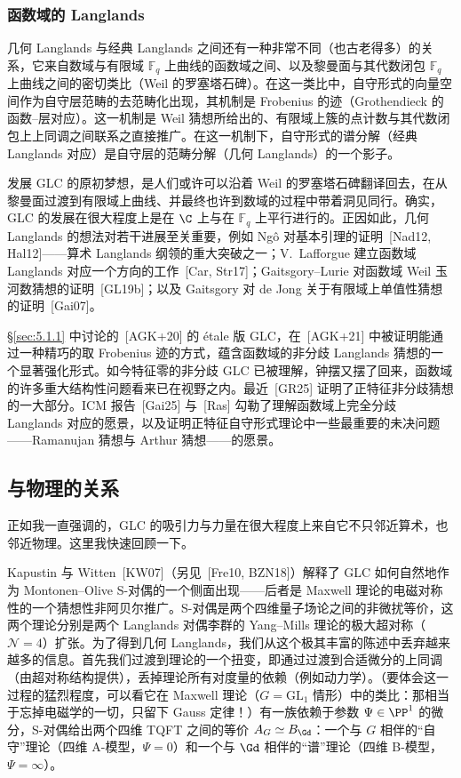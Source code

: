 \subsubsection{函数域的 Langlands}\label{sec:6.1.2}

几何 Langlands 与经典 Langlands 之间还有一种非常不同（也古老得多）的关系，它来自数域与有限域 $\mathbb{F}_{q}$ 上曲线的函数域之间、以及黎曼面与其代数闭包 $\mathbb{F}_{q}$ 上曲线之间的密切类比（Weil 的罗塞塔石碑）。在这一类比中，自守形式的向量空间作为自守层范畴的去范畴化出现，其机制是 Frobenius 的迹（Grothendieck 的函数–层对应）。这一机制是 Weil 猜想所给出的、有限域上簇的点计数与其代数闭包上上同调之间联系之直接推广。在这一机制下，自守形式的谱分解（经典 Langlands 对应）是自守层的范畴分解（几何 Langlands）的一个影子。

发展 GLC 的原初梦想，是人们或许可以沿着 Weil 的罗塞塔石碑翻译回去，在从黎曼面过渡到有限域上曲线、并最终也许到数域的过程中带着洞见同行。确实，GLC 的发展在很大程度上是在 $\C$ 上与在 $\mathbb{F}_{q}$ 上平行进行的。正因如此，几何 Langlands 的想法对若干进展至关重要，例如 Ngô 对基本引理的证明~[Nad12, Hal12]——算术 Langlands 纲领的重大突破之一；V.~Lafforgue 建立函数域 Langlands 对应一个方向的工作~[Car, Str17]；Gaitsgory–Lurie 对函数域 Weil 玉河数猜想的证明~[GL19b]；以及 Gaitsgory 对 de Jong 关于有限域上单值性猜想的证明~[Gai07]。

\S\ref{sec:5.1.1} 中讨论的~[AGK+20] 的 étale 版 GLC，在~[AGK+21] 中被证明能通过一种精巧的取 Frobenius 迹的方式，蕴含函数域的非分歧 Langlands 猜想的一个显著强化形式。如今特征零的非分歧 GLC 已被理解，钟摆又摆了回来，函数域的许多重大结构性问题看来已在视野之内。最近~[GR25] 证明了正特征非分歧猜想的一大部分。ICM 报告~[Gai25] 与~[Ras] 勾勒了理解函数域上完全分歧 Langlands 对应的愿景，以及证明正特征自守形式理论中一些最重要的未决问题——Ramanujan 猜想与 Arthur 猜想——的愿景。

\subsection{与物理的关系}\label{sec:6.2}

正如我一直强调的，GLC 的吸引力与力量在很大程度上来自它不只邻近算术，也邻近物理。这里我快速回顾一下。

Kapustin 与 Witten~[KW07]（另见~[Fre10, BZN18]）解释了 GLC 如何自然地作为 Montonen–Olive S-对偶的一个侧面出现——后者是 Maxwell 理论的电磁对称性的一个猜想性非阿贝尔推广。S-对偶是两个四维量子场论之间的非微扰等价，这两个理论分别是两个 Langlands 对偶李群的 Yang–Mills 理论的极大超对称（$\mathcal{N}=4$）扩张。为了得到几何 Langlands，我们从这个极其丰富的陈述中丢弃越来越多的信息。首先我们过渡到理论的一个扭变，即通过过渡到合适微分的上同调（由超对称结构提供），丢掉理论所有对度量的依赖（例如动力学）。（要体会这一过程的猛烈程度，可以看它在 Maxwell 理论（$G=\mathrm{GL}_{1}$ 情形）中的类比：那相当于忘掉电磁学的一切，只留下 Gauss 定律！）有一族依赖于参数 $\Psi\in\PP^{1}$ 的微分，S-对偶给出两个四维 TQFT 之间的等价 $A_{G}\simeq B_{\Gd}$：一个与 $G$ 相伴的“自守”理论（四维 A-模型，$\Psi=0$）和一个与 $\Gd$ 相伴的“谱”理论（四维 B-模型，$\Psi=\infty$）。

